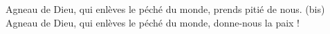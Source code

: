 Agneau de Dieu, qui enlèves le péché du monde, prends pitié de nous. (bis)\\
Agneau de Dieu, qui enlèves le péché du monde, donne-nous la paix !
